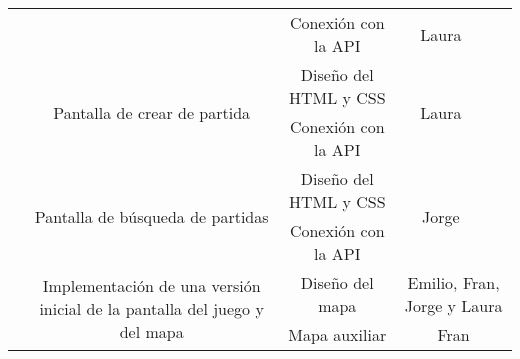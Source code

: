 \documentclass[11pt, a4paper, titlepage]{article}
\begin{document}
\begin{landscape}
\begin{table}[hbt!]
\begin{tabular}{c|ccll|cc|}
\multicolumn{1}{|c|}{}                            & \multicolumn{1}{c|}{}                                                                                           & \multicolumn{3}{c|}{Conexión con la API}                                                                       & \multicolumn{1}{c|}{Laura}                  &                                \\ \cline{2-6}
\multicolumn{1}{|c|}{}                            & \multicolumn{1}{c|}{\multirow{2}{*}{Pantalla de crear de partida}}                                              & \multicolumn{3}{c|}{Diseño del HTML y CSS}                                                                     & \multicolumn{1}{c|}{\multirow{2}{*}{Laura}} &                                \\ \cline{3-5}
\multicolumn{1}{|c|}{}                            & \multicolumn{1}{c|}{}                                                                                           & \multicolumn{3}{c|}{Conexión con la API}                                                                       & \multicolumn{1}{c|}{}                       &                                \\ \cline{2-6}
\multicolumn{1}{|c|}{}                            & \multicolumn{1}{c|}{\multirow{2}{*}{Pantalla de búsqueda de partidas}}                                          & \multicolumn{3}{c|}{Diseño del HTML y CSS}                                                                     & \multicolumn{1}{c|}{\multirow{2}{*}{Jorge}} &                                \\ \cline{3-5}
\multicolumn{1}{|c|}{}                            & \multicolumn{1}{c|}{}                                                                                           & \multicolumn{3}{c|}{Conexión con la API}                                                                       & \multicolumn{1}{c|}{}                       &                                \\ \cline{2-7}
\multicolumn{1}{|c|}{}                            & \multicolumn{1}{c|}{\multirow{5}{*}{Implementación de una versión inicial de la pantalla del juego y del mapa}} & \multicolumn{3}{c|}{Diseño del mapa}                                                                           & \multicolumn{2}{c|}{Emilio, Fran, Jorge y Laura}                             \\ \cline{3-7}
\multicolumn{1}{|c|}{}                            & \multicolumn{1}{c|}{}                                                                                           & \multicolumn{3}{c|}{Mapa auxiliar}                                                                             & \multicolumn{2}{c|}{Fran}                                                    \\ \cline{3-7}

\end{tabular}
\end{table}
\end{landscape}
\end{document}
